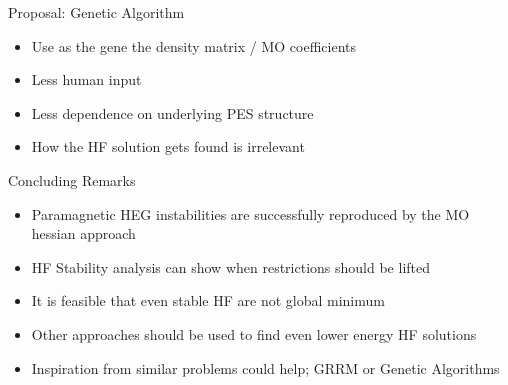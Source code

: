\documentclass[10pt]{beamer}
\begin{document}
{{{{{{{{{{\begin{frame}{Proposal: Genetic Algorithm}
  \begin{itemize}
    \item{ Use as the gene the density matrix / MO coefficients }
    \item{ Less human input }
    \item{ Less dependence on underlying PES structure }
    \item{ How the HF solution gets found is irrelevant } 
  \end{itemize}
\end{frame}

\begin{frame}{Concluding Remarks}
  \begin{itemize}
    \item{ Paramagnetic HEG instabilities are successfully reproduced by the MO hessian approach }
    \item{ HF Stability analysis can show when restrictions should be lifted }
    \item{ It is feasible that even stable HF are not global minimum }
    \item{ Other approaches should be used to find even lower energy HF solutions }
    \item{ Inspiration from similar problems could help; GRRM or Genetic Algorithms } 
  \end{itemize}
\end{frame}

}}}}}}}}}}
\end{document}

